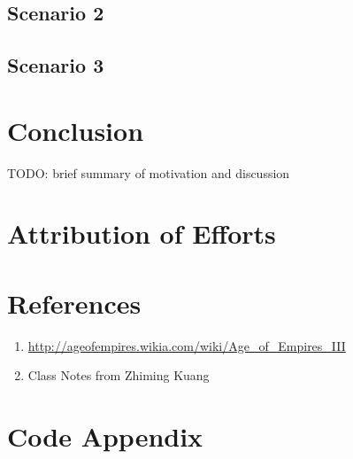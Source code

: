 \documentclass[12pt]{article}
\begin{document}
\subsection{Scenario 2}
\subsection{Scenario 3}

\section{Conclusion} 
TODO: brief summary of motivation and discussion

\section{Attribution of Efforts} 
\paragraph{}

\section{References} 
\begin{enumerate}
\item \url{http://ageofempires.wikia.com/wiki/Age_of_Empires_III}
\item Class Notes from Zhiming Kuang
\end{enumerate}

\section{Code Appendix} 
\end{document}

